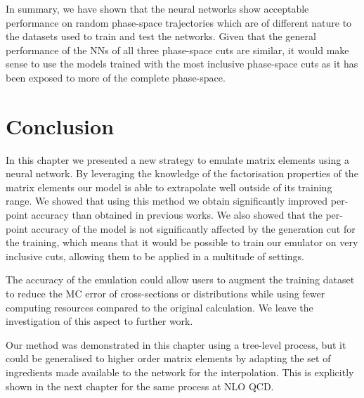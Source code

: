 \documentclass[main.tex]{subfiles}
\begin{document}
In summary, we have shown that the neural networks show acceptable performance on random phase-space trajectories which are of different nature to the datasets used to train and test the networks.
Given that the general performance of the NNs of all three phase-space cuts are similar, it would make sense to use the models trained with the most inclusive phase-space cuts as it has been exposed
to more of the complete phase-space.

\section{Conclusion}\label{sec:conclusion}
In this chapter we presented a new strategy to emulate matrix elements using a neural network. By leveraging the knowledge of 
the factorisation properties of the matrix elements our model is able to extrapolate well outside of its training range. 
We showed that using this method we obtain significantly improved per-point accuracy than obtained in previous works. 
We also showed that the per-point accuracy of the model is not significantly affected by the generation cut for the training, which means that
it would be possible to train our emulator on very inclusive cuts, allowing them to be applied in a multitude of settings. 

The accuracy of the emulation could allow users to augment the training dataset to reduce the MC error of cross-sections or distributions while using 
fewer computing resources compared to the original calculation. We leave the investigation of this aspect to further work.

Our method was demonstrated in this chapter using a tree-level process, but it could be generalised to higher order matrix elements by adapting the set 
of ingredients made available to the network for the interpolation. This is explicitly shown in the next chapter for the same process at NLO QCD.
\end{document}

